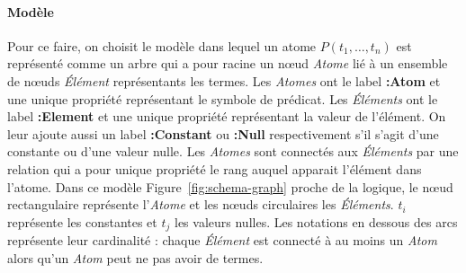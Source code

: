 \paragraph{Modèle}
Pour ce faire, on choisit le modèle dans lequel un atome $P(t_1, \dots, t_n)$ est représenté comme un arbre qui a pour racine un nœud \textit{Atome} lié à un ensemble de nœuds \textit{Élément} représentants les termes.
Les \textit{Atomes} ont le label \textbf{:Atom} et une unique propriété représentant le symbole de prédicat.
Les \textit{Éléments} ont le label \textbf{:Element} et une unique propriété représentant la valeur de l'élément.
On leur ajoute aussi un label \textbf{:Constant} ou \textbf{:Null} respectivement s'il s'agit d'une constante ou d'une valeur nulle.
Les \textit{Atomes} sont connectés aux \textit{Éléments} par une relation qui a pour unique propriété le rang auquel apparait l'élément dans l'atome.
Dans ce modèle Figure~\ref{fig:schema-graph} proche de la logique, le nœud rectangulaire représente l'\textit{Atome} et les nœuds circulaires les \textit{Éléments}.
$t_i$ représente les constantes et $t_j$ les valeurs nulles.
Les notations en dessous des arcs représente leur cardinalité : chaque \textit{Élément} est connecté à au moins un \textit{Atom} alors qu'un \textit{Atom} peut ne pas avoir de termes.


